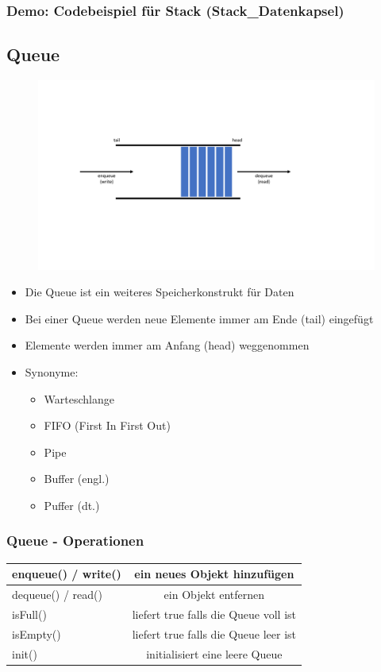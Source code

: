 \subsubsection{Demo: Codebeispiel für Stack (Stack\_Datenkapsel)}
\label{sec:Demo: Codebeispiel für Stack}




\subsection{Queue}
\label{sec:Queue}
\noindent
\begin{figure}[hh]
	\centering
	\includegraphics[width=0.5\linewidth]{images/klasse2.pdf}
\end{figure}
\begin{itemize}
	\item Die Queue ist ein weiteres Speicherkonstrukt für Daten
	\item Bei einer Queue werden neue Elemente immer am Ende (tail) eingefügt
	\item Elemente werden immer am Anfang (head) weggenommen
	\item Synonyme:
	\begin{itemize}
		\item Warteschlange
		\item FIFO (First In First Out)
		\item Pipe
		\item Buffer (engl.)
		\item Puffer (dt.)
	\end{itemize}
\end{itemize}

\subsubsection{Queue - Operationen}
\label{sec:Queue - Operationen}
\begin{tabular}{lc}
	enqueue() / write() & ein neues Objekt hinzufügen \\ 
	\hline 
	dequeue() / read() & ein Objekt entfernen \\ 
	\hline 
	isFull() & liefert true falls die Queue voll ist \\ 
	\hline 
	isEmpty() & liefert true falls die Queue leer ist \\ 
	init() & initialisiert eine leere Queue \\ 
\end{tabular} 

